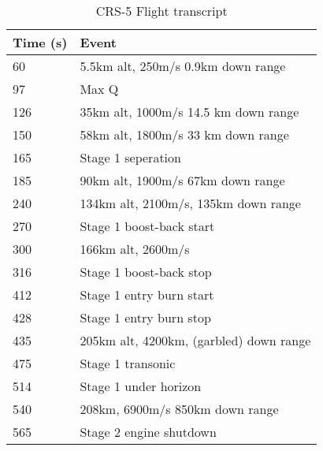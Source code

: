 \begin{table}[!htb]
\centering
\begin{tabular}{|l|l|}
\hline
\rowcolor[HTML]{C0C0C0} 
Time (s) & Event                                \\ \hline
60       & 5.5km alt, 250m/s 0.9km down range   \\ \hline
\rowcolor[HTML]{EFEFEF} 
97       & Max Q                                \\ \hline
126      & 35km alt, 1000m/s 14.5 km down range \\ \hline
\rowcolor[HTML]{EFEFEF} 
150      & 58km alt, 1800m/s 33 km down range   \\ \hline
165      & Stage 1 seperation                   \\ \hline
\rowcolor[HTML]{EFEFEF} 
185      & 90km alt, 1900m/s 67km down range    \\ \hline
240      & 134km alt, 2100m/s, 135km down range \\ \hline
\rowcolor[HTML]{EFEFEF} 
270      & Stage 1 boost-back start             \\ \hline
300      & 166km alt, 2600m/s                   \\ \hline
\rowcolor[HTML]{EFEFEF} 
316      & Stage 1 boost-back stop              \\ \hline
412      & Stage 1 entry burn start             \\ \hline
\rowcolor[HTML]{EFEFEF} 
428      & Stage 1 entry burn stop              \\ \hline
435      & 205km alt, 4200km, (garbled) down range    \\ \hline
\rowcolor[HTML]{EFEFEF} 
475      & Stage 1 transonic                    \\ \hline
514      & Stage 1 under horizon                \\ \hline
\rowcolor[HTML]{EFEFEF} 
540      & 208km, 6900m/s 850km down range      \\ \hline
565      & Stage 2 engine shutdown              \\ \hline
\end{tabular}
\caption{CRS-5 Flight transcript \cite{CRS5}}
\label{tab:CRS5}
\end{table}

